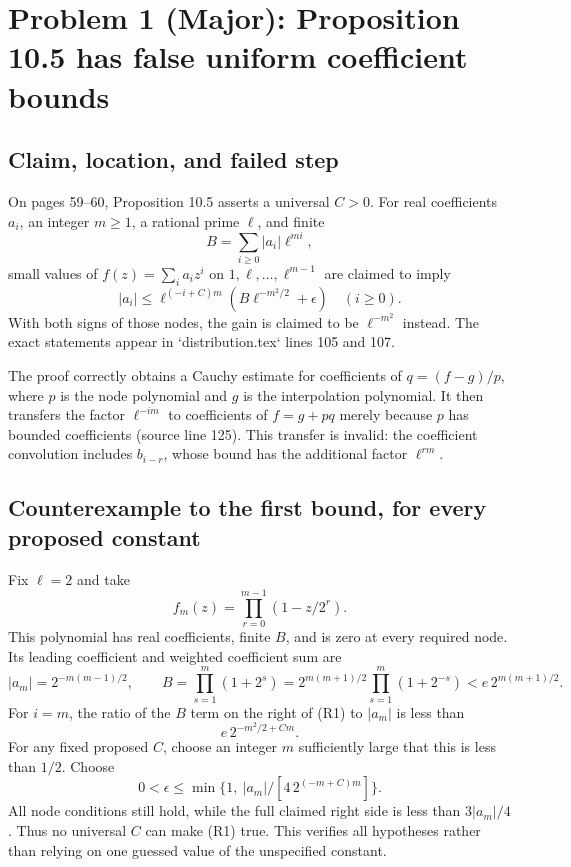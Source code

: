 \documentclass[10pt]{article}
\begin{document}
\section*{Problem 1 (Major): Proposition 10.5 has false uniform coefficient bounds}
\subsection*{Claim, location, and failed step}
On pages 59–60, Proposition 10.5 asserts a universal \(C>0\). For real coefficients \(a_i\), an integer \(m\ge1\), a rational prime \(\ell\), and finite \[B=\sum_{i\ge0}|a_i|\ell^{mi},\] small values of \(f(z)=\sum_i a_i z^i\) on \(1,\ell,\ldots,\ell^{m-1}\) are claimed to imply \[|a_i|\le \ell^{(-i+C)m}(B\ell^{-m^2/2}+\epsilon)\quad(i\ge0).
 \tag{R1}\] With both signs of those nodes, the gain is claimed to be \(\ell^{-m^2}\) instead. The exact statements appear in `distribution.tex` lines 105 and 107.\par
The proof correctly obtains a Cauchy estimate for coefficients of \(q=(f-g)/p\), where \(p\) is the node polynomial and \(g\) is the interpolation polynomial. It then transfers the factor \(\ell^{-im}\) to coefficients of \(f=g+pq\) merely because \(p\) has bounded coefficients (source line 125). This transfer is invalid: the coefficient convolution includes \(b_{i-r}\), whose bound has the additional factor \(\ell^{rm}\).\par
\subsection*{Counterexample to the first bound, for every proposed constant}
Fix \(\ell=2\) and take \[f_m(z)=\prod_{r=0}^{m-1}(1-z/2^r).\] This polynomial has real coefficients, finite \(B\), and is zero at every required node. Its leading coefficient and weighted coefficient sum are \[|a_m|=2^{-m(m-1)/2},\qquad
 B=\prod_{s=1}^{m}(1+2^s)
 =2^{m(m+1)/2}\prod_{s=1}^{m}(1+2^{-s})
 <e\,2^{m(m+1)/2}.\] For \(i=m\), the ratio of the \(B\) term on the right of (R1) to \(|a_m|\) is less than \[e\,2^{-m^2/2+Cm}.\] For any fixed proposed \(C\), choose an integer \(m\) sufficiently large that this is less than \(1/2\). Choose \[0<\epsilon\le
 \min\{1,\ |a_m|/[4\,2^{(-m+C)m}]\}.\] All node conditions still hold, while the full claimed right side is less than \(3|a_m|/4\). Thus no universal \(C\) can make (R1) true. This verifies all hypotheses rather than relying on one guessed value of the unspecified constant.\par
\end{document}
